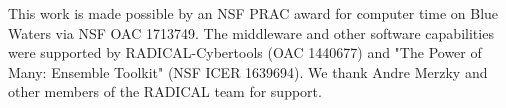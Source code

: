 This work is made possible by an NSF PRAC award for computer time on Blue Waters via
NSF OAC	1713749. The middleware and other software capabilities were supported by RADICAL-Cybertools (OAC 1440677) and "The Power of Many: Ensemble Toolkit" (NSF ICER 1639694). We thank Andre Merzky and other members of the RADICAL team for support.
